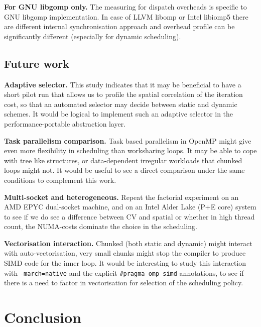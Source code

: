 \documentclass[conference]{IEEEtran}
\begin{document}
\textbf{For GNU libgomp only.} The measuring for dispatch overheads is specific to GNU libgomp implementation. In case of LLVM libomp or Intel libiomp5 there are different internal synchronisation approach and overhead profile can be significantly different (especially for dynamic scheduling).

\subsection{Future work}

\textbf{Adaptive selector.} This study indicates that it may be beneficial to have a short pilot run that allows us to profile the spatial correlation of the iteration cost, so that an automated selector may decide between static and dynamic schemes. It would be logical to implement such an adaptive selector in the performance-portable abstraction layer.

\textbf{Task parallelism comparison.} Task based parallelism in OpenMP might give even more flexibility in scheduling than worksharing loops. It may be able to cope with tree like structures, or data-dependent irregular workloads that chunked loops might not. It would be useful to see a direct comparison under the same conditions to complement this work.

\textbf{Multi-socket and heterogeneous.} Repeat the factorial experiment on an AMD EPYC dual-socket machine, and on an Intel Alder Lake (P+E core) system to see if we do see a difference between CV and spatial or whether in high thread count, the NUMA-costs dominate the choice in the scheduling.

\textbf{Vectorisation interaction.} Chunked (both static and dynamic) might interact with auto-vectorisation, very small chunks might stop the compiler to produce SIMD code for the inner loop. It would be interesting to study this interaction with \texttt{-march=native} and the explicit \texttt{\#pragma omp simd} annotations, to see if there is a need to factor in vectorisation for selection of the scheduling policy.

\section{Conclusion}
\end{document}
